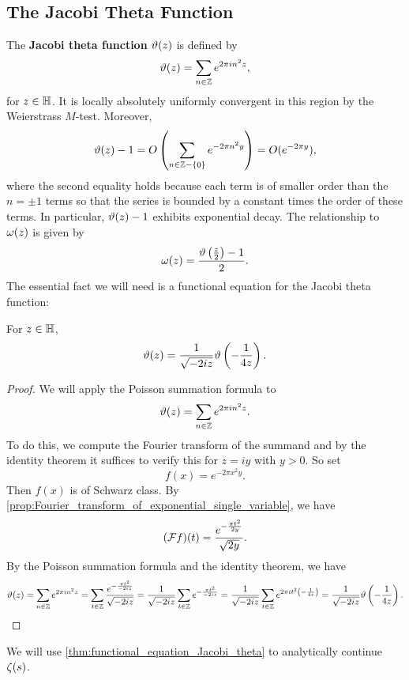     \subsection*{The Jacobi Theta Function}
      The \textbf{Jacobi theta function} $\vartheta(z)$ is defined by
      \[
        \vartheta(z) = \sum_{n \in \mathbb{Z}}e^{2\pi in^{2}z},
      \]
      for $z \in \mathbb{H}$. It is locally absolutely uniformly convergent in this region by the Weierstrass $M$-test. Moreover,
      \[
        \vartheta(z)-1 = O\left(\sum_{n \in \mathbb{Z}-\{0\}}e^{-2\pi n^{2}y}\right) = O(e^{-2\pi y}),
      \]
      where the second equality holds because each term is of smaller order than the $n = \pm 1$ terms so that the series is bounded by a constant times the order of these terms. In particular, $\vartheta(z)-1$ exhibits exponential decay. The relationship to $\omega(z)$ is given by
      \[
        \omega(z) = \frac{\vartheta\left(\frac{z}{2}\right)-1}{2}.
      \]
      The essential fact we will need is a functional equation for the Jacobi theta function:

      \begin{theorem}\label{thm:functional_equation_Jacobi_theta}
        For $z \in \mathbb{H}$,
        \[
          \vartheta(z) = \frac{1}{\sqrt{-2iz}}\vartheta\left(-\frac{1}{4z}\right).
        \]
      \end{theorem}
      \begin{proof}
        We will apply the Poisson summation formula to
        \[
          \vartheta(z) = \sum_{n \in \mathbb{Z}}e^{2\pi in^{2}z}.
        \]
        To do this, we compute the Fourier transform of the summand and by the identity theorem it suffices to verify this for $z = iy$ with $y > 0$. So set
        \[
          f(x) = e^{-2\pi x^{2}y}.
        \]
        Then $f(x)$ is of Schwarz class. By \cref{prop:Fourier_transform_of_exponential_single_variable}, we have
        \[
          (\mathcal{F}f)(t) = \frac{e^{-\frac{\pi t^{2}}{2y}}}{\sqrt{2y}}.
        \]
        By the Poisson summation formula and the identity theorem, we have
        \[
          \vartheta(z) = \sum_{n \in \mathbb{Z}}e^{2\pi in^{2}z} = \sum_{t \in \mathbb{Z}}\frac{e^{-\frac{\pi t^{2}}{-2iz}}}{\sqrt{-2iz}} = \frac{1}{\sqrt{-2iz}}\sum_{t \in \mathbb{Z}}e^{-\frac{\pi t^{2}}{-2iz}} = \frac{1}{\sqrt{-2iz}}\sum_{t \in \mathbb{Z}}e^{2\pi it^{2}\left(-\frac{1}{4z}\right)} = \frac{1}{\sqrt{-2iz}}\vartheta\left(-\frac{1}{4z}\right).
        \]
      \end{proof}

      We will use \cref{thm:functional_equation_Jacobi_theta} to analytically continue $\zeta(s)$.
